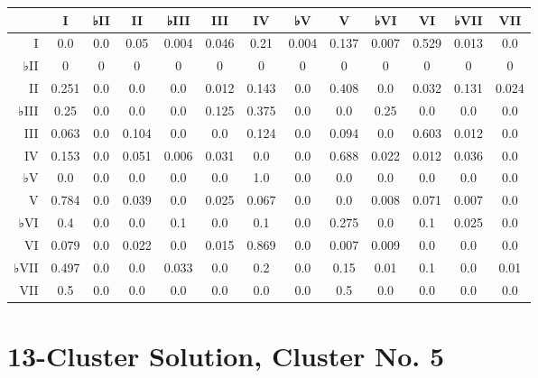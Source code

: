 \begin{table}[htbp]
\begin{minipage}{\linewidth}
\setlength{\tymax}{0.5\linewidth}
\centering
\small
\begin{tabulary}{\textwidth}{@{}RCCCCCCCCCCCC@{}} \toprule
&I&♭II&II&♭III&III&IV&♭V&V&♭VI&VI&♭VII&VII\\
\midrule
I&0.0&0.0&0.05&0.004&0.046&0.21&0.004&0.137&0.007&0.529&0.013&0.0\\
♭II&0&0&0&0&0&0&0&0&0&0&0&0\\
II&0.251&0.0&0.0&0.0&0.012&0.143&0.0&0.408&0.0&0.032&0.131&0.024\\
♭III&0.25&0.0&0.0&0.0&0.125&0.375&0.0&0.0&0.25&0.0&0.0&0.0\\
III&0.063&0.0&0.104&0.0&0.0&0.124&0.0&0.094&0.0&0.603&0.012&0.0\\
IV&0.153&0.0&0.051&0.006&0.031&0.0&0.0&0.688&0.022&0.012&0.036&0.0\\
♭V&0.0&0.0&0.0&0.0&0.0&1.0&0.0&0.0&0.0&0.0&0.0&0.0\\
V&0.784&0.0&0.039&0.0&0.025&0.067&0.0&0.0&0.008&0.071&0.007&0.0\\
♭VI&0.4&0.0&0.0&0.1&0.0&0.1&0.0&0.275&0.0&0.1&0.025&0.0\\
VI&0.079&0.0&0.022&0.0&0.015&0.869&0.0&0.007&0.009&0.0&0.0&0.0\\
♭VII&0.497&0.0&0.0&0.033&0.0&0.2&0.0&0.15&0.01&0.1&0.0&0.01\\
VII&0.5&0.0&0.0&0.0&0.0&0.0&0.0&0.5&0.0&0.0&0.0&0.0\\

\bottomrule

\end{tabulary}
\end{minipage}
\end{table}

\section{13-Cluster Solution, Cluster No. 5}
\label{13-clustersolutionclusterno.5}

